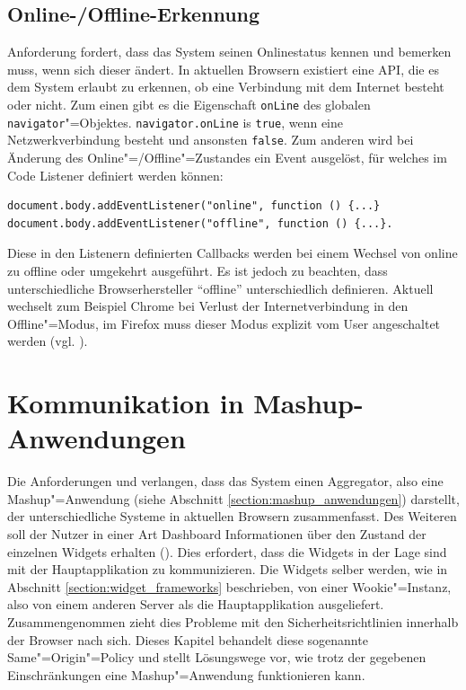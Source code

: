 \subsection{Online-/Offline-Erkennung}\label{section:online_offline_erkennung}
Anforderung  fordert, dass das System seinen Onlinestatus kennen und bemerken muss, wenn sich dieser ändert. In aktuellen Browsern existiert eine \ac{API}, die es dem System erlaubt zu erkennen, ob eine Verbindung mit dem Internet besteht oder nicht. Zum einen gibt es die Eigenschaft \texttt{onLine} des globalen \texttt{navigator}"=Objektes. \texttt{navigator.onLine} is \texttt{true}, wenn eine Netzwerkverbindung besteht und ansonsten \texttt{false}. Zum anderen wird bei Änderung des Online"=/Offline"=Zustandes ein Event ausgelöst, für welches im Code Listener definiert werden können:
\begin{lstlisting}
document.body.addEventListener("online", function () {...} 
document.body.addEventListener("offline", function () {...}.
\end{lstlisting}          
Diese in den Listenern definierten Callbacks werden bei einem Wechsel von online zu offline oder umgekehrt ausgeführt. Es ist jedoch zu beachten, dass unterschiedliche Browserhersteller "`offline"' unterschiedlich definieren. Aktuell wechselt zum Beispiel Chrome bei Verlust der Internetverbindung in den Offline"=Modus, im Firefox muss dieser Modus explizit vom User angeschaltet werden (vgl. \cite{MozBug2011}).

\section{Kommunikation in Mashup-Anwendungen}\label{section:kommunikation_in_mashup_anwendungen}
Die Anforderungen  und  verlangen, dass das System einen Aggregator, also eine Mashup"=Anwendung (siehe Abschnitt \ref{section:mashup_anwendungen}) darstellt, der unterschiedliche Systeme in aktuellen Browsern zusammenfasst. Des Weiteren soll der Nutzer in einer Art Dashboard Informationen über den Zustand der einzelnen Widgets erhalten (). Dies erfordert, dass die Widgets in der Lage sind mit der Hauptapplikation zu kommunizieren. Die Widgets selber werden, wie in Abschnitt \ref{section:widget_frameworks} beschrieben, von einer Wookie"=Instanz, also von einem anderen Server als die Hauptapplikation ausgeliefert. Zusammengenommen zieht dies Probleme mit den Sicherheitsrichtlinien innerhalb der Browser nach sich. Dieses Kapitel behandelt diese sogenannte Same"=Origin"=Policy und stellt Lösungswege vor, wie trotz der gegebenen Einschränkungen eine Mashup"=Anwendung funktionieren kann.

